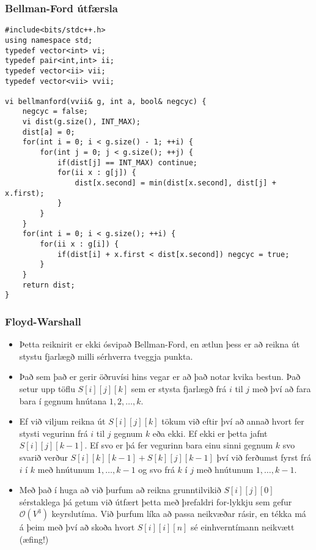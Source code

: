 \documentclass{beamer}
\begin{document}
\begin{frame}[fragile]
\frametitle{Bellman-Ford útfærsla}

\begin{tiny}
\begin{verbatim}
#include<bits/stdc++.h>
using namespace std;
typedef vector<int> vi;
typedef pair<int,int> ii;
typedef vector<ii> vii;
typedef vector<vii> vvii;

vi bellmanford(vvii& g, int a, bool& negcyc) {
    negcyc = false;
    vi dist(g.size(), INT_MAX);
    dist[a] = 0;
    for(int i = 0; i < g.size() - 1; ++i) {
        for(int j = 0; j < g.size(); ++j) {
            if(dist[j] == INT_MAX) continue;
            for(ii x : g[j]) {
                dist[x.second] = min(dist[x.second], dist[j] + x.first);
            }
        }
    }
    for(int i = 0; i < g.size(); ++i) {
        for(ii x : g[i]) {
            if(dist[i] + x.first < dist[x.second]) negcyc = true;
        }
    }
    return dist;
}
\end{verbatim}
\end{tiny}

\end{frame}

\begin{frame}
\frametitle{Floyd-Warshall}

\begin{itemize}

\item<1-> Þetta reiknirit er ekki ósvipað Bellman-Ford, en ætlun þess er að reikna út stystu fjarlægð milli sérhverra tveggja punkta.

\item<2-> Það sem það er gerir öðruvísi hins vegar er að það notar kvika bestun. Það setur upp töflu $S[i][j][k]$ sem er stysta fjarlægð frá $i$ til $j$ með því að fara bara í gegnum hnútana $1,2,\dots,k$.

\item<3-> Ef við viljum reikna út $S[i][j][k]$ tökum við eftir því að annað hvort fer stysti vegurinn frá $i$ til $j$ gegnum $k$ eða ekki. Ef ekki er þetta jafnt $S[i][j][k - 1]$. Ef svo er þá fer vegurinn bara einu sinni gegnum $k$ svo svarið verður $S[i][k][k - 1] + S[k][j][k - 1]$ því við ferðumst fyrst frá $i$ í $k$ með hnútunum $1,\dots,k-1$ og svo frá $k$ í $j$ með hnútunum $1,\dots,k-1$.

\item<4-> Með það í huga að við þurfum að reikna grunntilvikið $S[i][j][0]$ sérstaklega þá getum við útfært þetta með þrefaldri for-lykkju sem gefur $\mathcal{O}(V^3)$ keyrslutíma. Við þurfum líka að passa neikvæðar rásir, en tékka má á þeim með því að skoða hvort $S[i][i][n]$ sé einhverntímann neikvætt (æfing!)

\end{itemize}

\end{frame}
\end{document}
